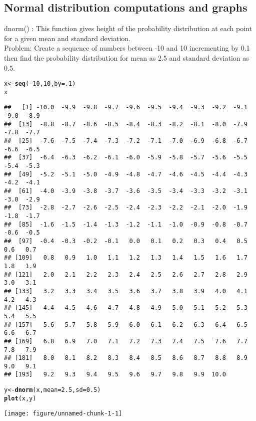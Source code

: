 \documentclass{article}\usepackage[]{graphicx}\usepackage[]{xcolor}
\makeatletter
\def\maxwidth{ %
  \ifdim\Gin@nat@width>\linewidth
    \linewidth
  \else
    \Gin@nat@width
  \fi
}
\newcommand{\hlnum}[1]{\textcolor[rgb]{0.686,0.059,0.569}{#1}}%
\newcommand{\hlopt}[1]{\textcolor[rgb]{0,0,0}{#1}}%
\newcommand{\hldef}[1]{\textcolor[rgb]{0.345,0.345,0.345}{#1}}%
\newcommand{\hlkwb}[1]{\textcolor[rgb]{0.69,0.353,0.396}{#1}}%
\newcommand{\hlkwc}[1]{\textcolor[rgb]{0.333,0.667,0.333}{#1}}%
\newcommand{\hlkwd}[1]{\textcolor[rgb]{0.737,0.353,0.396}{\textbf{#1}}}%
\newenvironment{kframe}{%
 \def\at@end@of@kframe{}%
 \ifinner\ifhmode%
  \def\at@end@of@kframe{\end{minipage}}%
  \begin{minipage}{\columnwidth}%
 \fi\fi%
 \def\FrameCommand##1{\hskip\@totalleftmargin \hskip-\fboxsep
 \colorbox{shadecolor}{##1}\hskip-\fboxsep
     \hskip-\linewidth \hskip-\@totalleftmargin \hskip\columnwidth}%
 \MakeFramed {\advance\hsize-\width
   \@totalleftmargin\z@ \linewidth\hsize
   \@setminipage}}%
 {\par\unskip\endMakeFramed%
 \at@end@of@kframe}
\newenvironment{knitrout}{}{} %
\makeatother
\begin{document}
\subsection{Normal distribution computations and graphs}
dnorm() :
This function gives height of the probability distribution at each point for a given mean and standard deviation.\\
Problem: \newline
Create a sequence of numbers between -10 and 10 incrementing by 0.1 then find the probability distribution  for mean as 2.5 and standard deviation as 0.5.
\begin{knitrout}
\color{fgcolor}\begin{kframe}
\begin{alltt}
\hldef{x} \hlkwb{<-} \hlkwd{seq}\hldef{(}\hlopt{-}\hlnum{10}\hldef{,}\hlnum{10}\hldef{,}\hlkwc{by}\hldef{=}\hlnum{.1}\hldef{)}
\hldef{x}
\end{alltt}
\begin{verbatim}
##   [1] -10.0  -9.9  -9.8  -9.7  -9.6  -9.5  -9.4  -9.3  -9.2  -9.1  -9.0  -8.9
##  [13]  -8.8  -8.7  -8.6  -8.5  -8.4  -8.3  -8.2  -8.1  -8.0  -7.9  -7.8  -7.7
##  [25]  -7.6  -7.5  -7.4  -7.3  -7.2  -7.1  -7.0  -6.9  -6.8  -6.7  -6.6  -6.5
##  [37]  -6.4  -6.3  -6.2  -6.1  -6.0  -5.9  -5.8  -5.7  -5.6  -5.5  -5.4  -5.3
##  [49]  -5.2  -5.1  -5.0  -4.9  -4.8  -4.7  -4.6  -4.5  -4.4  -4.3  -4.2  -4.1
##  [61]  -4.0  -3.9  -3.8  -3.7  -3.6  -3.5  -3.4  -3.3  -3.2  -3.1  -3.0  -2.9
##  [73]  -2.8  -2.7  -2.6  -2.5  -2.4  -2.3  -2.2  -2.1  -2.0  -1.9  -1.8  -1.7
##  [85]  -1.6  -1.5  -1.4  -1.3  -1.2  -1.1  -1.0  -0.9  -0.8  -0.7  -0.6  -0.5
##  [97]  -0.4  -0.3  -0.2  -0.1   0.0   0.1   0.2   0.3   0.4   0.5   0.6   0.7
## [109]   0.8   0.9   1.0   1.1   1.2   1.3   1.4   1.5   1.6   1.7   1.8   1.9
## [121]   2.0   2.1   2.2   2.3   2.4   2.5   2.6   2.7   2.8   2.9   3.0   3.1
## [133]   3.2   3.3   3.4   3.5   3.6   3.7   3.8   3.9   4.0   4.1   4.2   4.3
## [145]   4.4   4.5   4.6   4.7   4.8   4.9   5.0   5.1   5.2   5.3   5.4   5.5
## [157]   5.6   5.7   5.8   5.9   6.0   6.1   6.2   6.3   6.4   6.5   6.6   6.7
## [169]   6.8   6.9   7.0   7.1   7.2   7.3   7.4   7.5   7.6   7.7   7.8   7.9
## [181]   8.0   8.1   8.2   8.3   8.4   8.5   8.6   8.7   8.8   8.9   9.0   9.1
## [193]   9.2   9.3   9.4   9.5   9.6   9.7   9.8   9.9  10.0
\end{verbatim}
\begin{alltt}
\hldef{y} \hlkwb{<-} \hlkwd{dnorm}\hldef{(x,} \hlkwc{mean}\hldef{=} \hlnum{2.5}\hldef{,} \hlkwc{sd} \hldef{=} \hlnum{0.5}\hldef{)}
\hlkwd{plot}\hldef{(x,y)}
\end{alltt}
\end{kframe}
\texttt{[image: figure/unnamed-chunk-1-1]} 
\end{knitrout}
\end{document}
